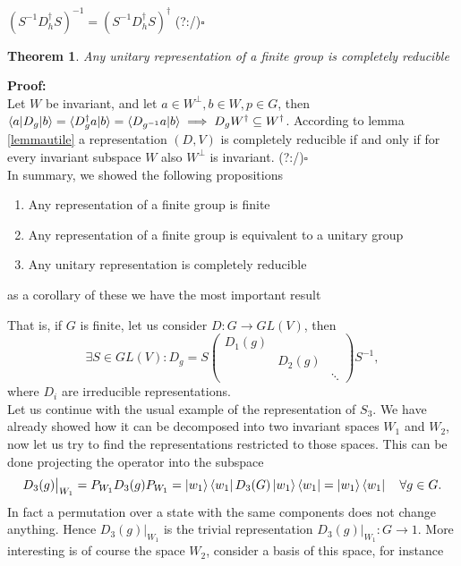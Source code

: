 \documentclass[12pt]{book}
\theoremstyle{plain}
\newtheorem{thm}{Theorem}[section]
\theoremstyle{definition}
\theoremstyle{remark}
\begin{document}
$(S^{-1}D_h^\dagger S)^{-1} = (S^{-1}D_h^\dagger S)^\dagger$ \hfill(?:/)\ensuremath{\square}
\begin{thm}
Any unitary representation of a finite group is completely reducible
\end{thm}
\hspace{-1.4em}\textbf{Proof:}\\
Let $W$ be invariant, and let $a\in W^\perp,b\in W,p\in G$, then $\braket{a|D_g|b} = \braket{D_g^\dagger a|b} = \braket{D_{g^{-1}}a|b}\implies D_g W^\dagger \subseteq W^\dagger$. 
According to lemma \ref{lemmautile} a representation $(D,V)$ is completely reducible if and only if for every invariant subspace $W$ also $W^\perp$ is invariant. \hfill(?:/)\ensuremath{\square}\\
In summary, we showed the following propositions
\begin{enumerate}
	\item Any representation of a finite group is finite
	\item Any representation of a finite group is equivalent to a unitary group
	\item Any unitary representation is completely reducible
\end{enumerate}
as a corollary of these we have the most important result
\begin{center}
\end{center}
That is, if $G$ is finite, let us consider $D:G\to GL(V)$, then 
\[\exists S\in GL(V): D_g = S\begin{pmatrix}D_1(g)\\&D_2(g)\\&&\ddots\end{pmatrix}S^{-1},\]
where $D_i$ are irreducible representations.\\
Let us continue with the usual example of the representation of $S_3$. We have already showed how it can be decomposed into two invariant spaces $W_1$ and $W_2$, now let us try to find the representations restricted to those spaces. This can be done projecting the operator into the subspace
\[D_3(g)\big|_{W_1} = P_{W_1}D_3(g)P_{W_1} = \ket{w_1}\bra{w_1}D_3(G)\ket{w_1}\bra{w_1} = \ket{w_1}\bra{w_1}\quad \forall g\in G.\]
In fact a permutation over a state with the same components does not change anything. Hence $D_3(g)\big|_{W_1}$ is the trivial representation $D_3(g)\big|_{W_1}:G\to 1$. More interesting is of course the space $W_2$, consider a basis of this space, for instance
\end{document}
